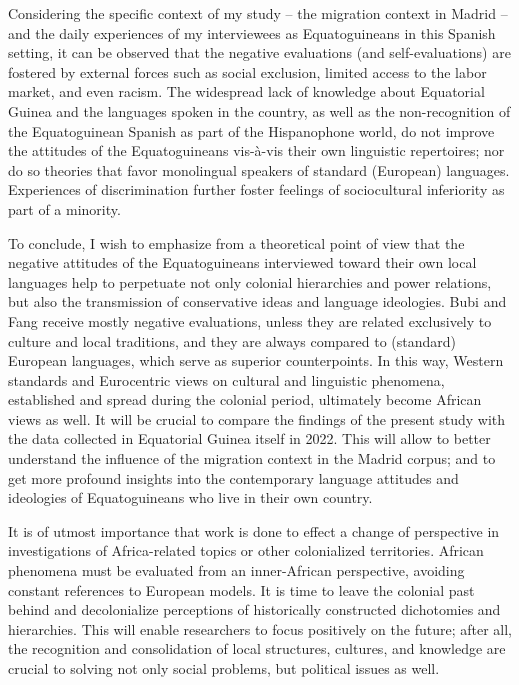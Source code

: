 \documentclass[output=paper]{langscibook}
\begin{document}
Considering the specific context of my study – the migration context in Madrid – and the daily experiences of my interviewees as Equatoguineans in this Spanish setting, it can be observed that the negative evaluations (and self-evaluations) are fostered by external forces such as social exclusion, limited access to the labor market, and even racism. The widespread lack of knowledge about Equatorial Guinea and the languages spoken in the country, as well as the non-recognition of the Equatoguinean Spanish as part of the Hispanophone world, do not improve the attitudes of the Equatoguineans vis-à-vis their own linguistic repertoires; nor do so theories that favor monolingual speakers of standard (European) languages. Experiences of discrimination further foster feelings of sociocultural inferiority as part of a minority.

To conclude, I wish to emphasize from a theoretical point of view that the negative attitudes of the Equatoguineans interviewed toward their own local languages help to perpetuate not only colonial hierarchies and power relations, but also the transmission of conservative ideas and language ideologies. Bubi and Fang receive mostly negative evaluations, unless they are related exclusively to culture and local traditions, and they are always compared to (standard) European languages, which serve as superior counterpoints. In this way, Western standards and Eurocentric views on cultural and linguistic phenomena, established and spread during the colonial period, ultimately become African views as well. It will be crucial to compare the findings of the present study with the data collected in Equatorial Guinea itself in 2022. This will allow to better understand the influence of the migration context in the Madrid corpus; and to get more profound insights into the contemporary language attitudes and ideologies of Equatoguineans who live in their own country.

It is of utmost importance that work is done to effect a change of perspective in investigations of Africa-related topics or other colonialized territories. African phenomena must be evaluated from an inner-African perspective, avoiding constant references to European models. It is time to leave the colonial past behind and decolonialize perceptions of historically constructed dichotomies and hierarchies. This will enable researchers to focus positively on the future; after all, the recognition and consolidation of local structures, cultures, and knowledge are crucial to solving not only social problems, but political issues as well.
\end{document}
